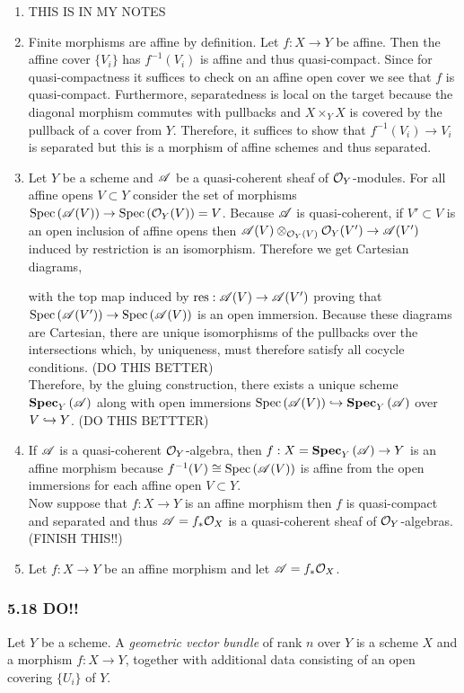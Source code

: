 \documentclass[12pt]{article}
\begin{document}
\begin{enumerate}
\item THIS IS IN MY NOTES

\item Finite morphisms are affine by definition. Let $f : X \to Y$ be affine. Then the affine cover $\{ V_i \}$ has $f^{-1}(V_i)$ is affine and thus quasi-compact. Since for quasi-compactness it suffices to check on an affine open cover we see that $f$ is quasi-compact. Furthermore, separatedness is local on the target because the diagonal morphism commutes with pullbacks and $X \times_Y X$ is covered by the pullback of a cover from $Y$. Therefore, it suffices to show that $f^{-1}(V_i) \to V_i$ is separated but this is a morphism of affine schemes and thus separated.

\item Let $Y$ be a scheme and $\mathscr{A}$ be a quasi-coherent sheaf of $\mathcal{O}_{Y}$-modules. For all affine opens $V \subset Y$ consider the set of morphisms $\mathrm{Spec}\left( \mathscr{A}(V) \right) \to \mathrm{Spec}\left( \mathcal{O}_{Y}(V) \right) = V$. Because $\mathscr{A}$ is quasi-coherent, if $V' \subset V$ is an open inclusion of affine opens then $\mathscr{A}(V) \otimes_{\mathcal{O}_{Y}(V)} \mathcal{O}_{Y}(V') \to \mathscr{A}(V')$ induced by restriction is an isomorphism. Therefore we get Cartesian diagrams,
\begin{center}
\end{center}
with the top map induced by $\mathrm{res} : \mathscr{A}(V) \to \mathscr{A}(V')$ proving that $\mathrm{Spec}\left( \mathscr{A}(V') \right) \to \mathrm{Spec}\left( \mathscr{A}(V) \right)$ is an open immersion. Because these diagrams are Cartesian, there are unique isomorphisms of the pullbacks over the intersections which, by uniqueness, must therefore satisfy all cocycle conditions. (DO THIS BETTER)
\bigskip\\
Therefore, by the gluing construction, there exists a unique scheme $\mathbf{Spec}_{Y}\left( \mathscr{A} \right)$ along with open immersions $\mathrm{Spec}\left( \mathscr{A}(V) \right) \hookrightarrow \mathbf{Spec}_{Y}\left( \mathscr{A} \right)$ over $V \hookrightarrow Y$. (DO THIS BETTTER)

\item If $\mathscr{A}$ is a quasi-coherent $\mathcal{O}_{Y}$-algebra, then $f : X = \mathbf{Spec}_{Y}\left( \mathscr{A} \right) \to Y$ is an affine morphism because $f^{-1}(V) \cong \mathrm{Spec}\left( \mathscr{A}(V) \right)$ is affine from the open immersions for each affine open $V \subset Y$. 
\bigskip\\
Now suppose that $f : X \to Y$ is an affine morphism then $f$ is quasi-compact and separated and thus $\mathscr{A} = f_* \mathcal{O}_{X}$ is a quasi-coherent sheaf of $\mathcal{O}_{Y}$-algebras. (FINISH THIS!!)

\item Let $f : X \to Y$ be an affine morphism and let $\mathscr{A}  = f_* \mathcal{O}_{X}$. 
\end{enumerate}

\subsubsection{5.18 DO!!}

Let $Y$ be a scheme. A \textit{geometric vector bundle} of rank $n$ over $Y$ is a scheme $X$ and a morphism $f : X \to Y$, together with additional data consisting of an open covering $\{ U_i \}$ of $Y$. 
\end{document}
